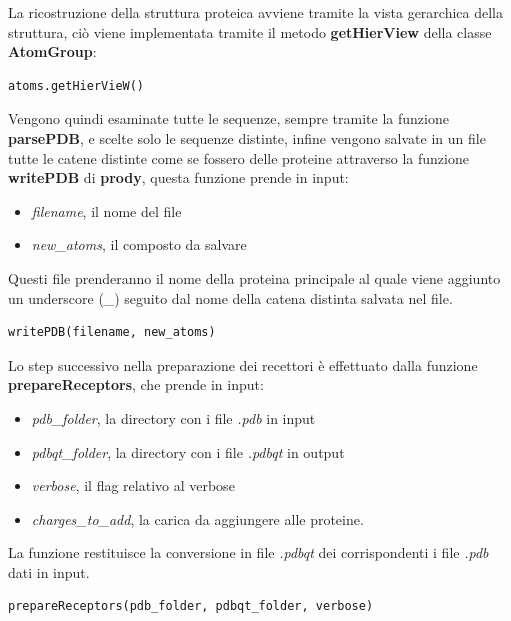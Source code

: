 La ricostruzione della struttura proteica avviene tramite la vista gerarchica della struttura, ciò viene implementata tramite il metodo \textbf{getHierView} della classe \textbf{AtomGroup}:

\begin{lstlisting}[language=Python, label=lst:code24, caption={atoms.getHierVieW}]
atoms.getHierVieW()
\end{lstlisting}

Vengono quindi esaminate tutte le sequenze, sempre tramite la funzione \textbf{parsePDB}, e scelte solo le sequenze distinte, infine vengono salvate in un file tutte le catene distinte come se fossero delle proteine attraverso la funzione \textbf{writePDB} di \textbf{prody}, questa funzione prende in input:

\begin{itemize}
    \item \textit{filename}, il nome del file
    \item \textit{new\_atoms}, il composto da salvare
\end{itemize}

Questi file prenderanno il nome della proteina principale al quale viene aggiunto un underscore (\textit{\_}) seguito dal nome della catena distinta salvata nel file.

\begin{lstlisting}[language=Python, label=lst:code25, caption={writePDB}]
writePDB(filename, new_atoms)
\end{lstlisting}

Lo step successivo nella preparazione dei recettori è effettuato dalla funzione \textbf{prepareReceptors}, che prende in input:

\begin{itemize}
    \item \textit{pdb\_folder}, la directory con i file \textit{.pdb} in input
    \item \textit{pdbqt\_folder}, la directory con i file \textit{.pdbqt} in output
    \item \textit{verbose}, il flag relativo al verbose
    \item \textit{charges\_to\_add}, la carica da aggiungere alle proteine.
\end{itemize}

La funzione restituisce la conversione in file \textit{.pdbqt} dei corrispondenti i file \textit{.pdb} dati in input.

\begin{lstlisting}[language=Python, label=lst:code26, caption={prepareReceptors}]
prepareReceptors(pdb_folder, pdbqt_folder, verbose)
\end{lstlisting}

